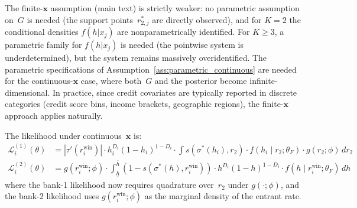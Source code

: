 \documentclass[12pt]{article}
\theoremstyle{plain}
\theoremstyle{plain}
\theoremstyle{definition}
\theoremstyle{remark}
\begin{document}
The finite-$\mathbf{x}$ assumption (main text) is strictly weaker: no parametric assumption on~$G$ is needed (the support points~$r_{2,j}^*$ are directly observed), and for $K = 2$ the conditional densities $f(h|x_j)$ are nonparametrically identified.  For $K \geq 3$, a parametric family for $f(h|x_j)$ is needed (the pointwise system is underdetermined), but the system remains massively overidentified.  The parametric specifications of Assumption~\ref{ass:parametric_continuous} are needed for the continuous-$\mathbf{x}$ case, where both~$G$ and the posterior become infinite-dimensional.  In practice, since credit covariates are typically reported in discrete categories (credit score bins, income brackets, geographic regions), the finite-$\mathbf{x}$ approach applies naturally.

The likelihood under continuous~$\mathbf{x}$ is:
\begin{align}
    \mathcal{L}_i^{(1)}(\theta) &= |\tau'(r_i^{\text{win}})| \cdot h_i^{D_i}(1-h_i)^{1-D_i} \cdot \int s(\sigma^*(h_i), r_2) \cdot f(h_i \mid r_2; \theta_F) \cdot g(r_2; \phi)\, dr_2  \\
    \mathcal{L}_i^{(2)}(\theta) &= g(r_i^{\text{win}}; \phi) \cdot \int_{\underline{h}}^{\bar{h}} (1-s(\sigma^*(h), r_i^{\text{win}})) \cdot h^{D_i}(1-h)^{1-D_i} \cdot f(h \mid r_i^{\text{win}}; \theta_F)\, dh
\end{align}
where the bank-1 likelihood now requires quadrature over~$r_2$ under $g(\cdot; \phi)$, and the bank-2 likelihood uses $g(r_i^{\text{win}}; \phi)$ as the marginal density of the entrant rate.
\end{document}
